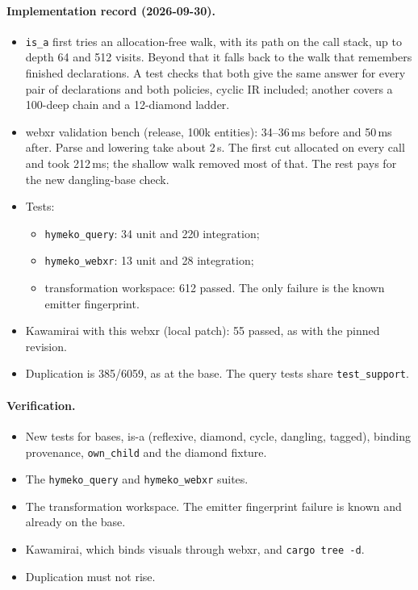 \documentclass[11pt,a4paper]{article}
\newcommand{\code}[1]{\texttt{#1}}
\begin{document}
\paragraph{Implementation record (2026-09-30).}
\begin{itemize}[nosep]
\item \code{is\_a} first tries an allocation-free walk, with its path on the call stack, up to depth 64
  and 512 visits. Beyond that it falls back to the walk that remembers finished declarations. A test
  checks that both give the same answer for every pair of declarations and both policies, cyclic IR
  included; another covers a 100-deep chain and a 12-diamond ladder.
\item webxr validation bench (release, 100k entities): 34--36\,ms before and 50\,ms after.
  Parse and lowering take about 2\,s. The first cut allocated on every call and took 212\,ms; the
  shallow walk removed most of that. The rest pays for the new dangling-base check.
\item Tests:
  \begin{itemize}[nosep]
  \item \code{hymeko\_query}: 34 unit and 220 integration;
  \item \code{hymeko\_webxr}: 13 unit and 28 integration;
  \item transformation workspace: 612 passed. The only failure is the known emitter fingerprint.
  \end{itemize}
\item Kawamirai with this webxr (local patch): 55 passed, as with the pinned revision.
\item Duplication is 385/6059, as at the base. The query tests share \code{test\_support}.
\end{itemize}

\paragraph{Verification.}
\begin{itemize}[nosep]
\item New tests for bases, is-a (reflexive, diamond, cycle, dangling, tagged), binding
  provenance, \code{own\_child} and the diamond fixture.
\item The \code{hymeko\_query} and \code{hymeko\_webxr} suites.
\item The transformation workspace. The emitter fingerprint failure is known and already on
  the base.
\item Kawamirai, which binds visuals through webxr, and \code{cargo tree -d}.
\item Duplication must not rise.
\end{itemize}

\begin{center}

\end{center}
\end{document}
